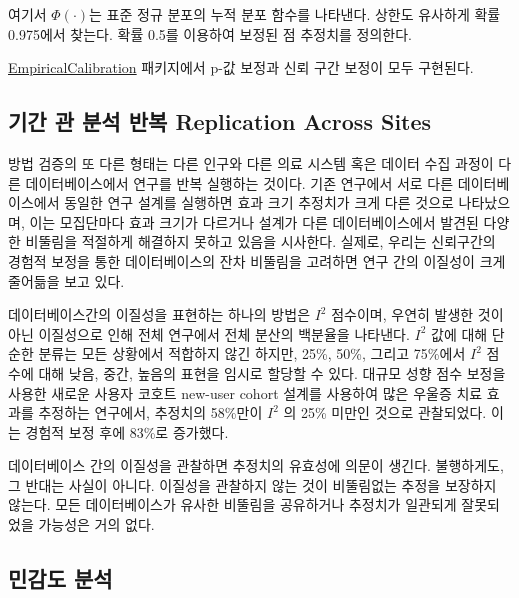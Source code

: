 \documentclass[10.5pt]{book}
\theoremstyle{definition}
\theoremstyle{definition}
\theoremstyle{definition}
\theoremstyle{remark}
\let\BeginKnitrBlock\begin \let\EndKnitrBlock\end
\begin{document}
여기서 \(\Phi(\cdot)\)는 표준 정규 분포의 누적 분포 함수를 나타낸다.
상한도 유사하게 확률 0.975에서 찾는다. 확률 0.5를 이용하여 보정된 점
추정치를 정의한다.

\href{https://ohdsi.github.io/EmpiricalCalibration/}{EmpiricalCalibration}
패키지에서 p-값 보정과 신뢰 구간 보정이 모두 구현된다.

\subsection{기간 관 분석 반복 Replication Across
Sites}\label{----replication-across-sites}


방법 검증의 또 다른 형태는 다른 인구와 다른 의료 시스템 혹은 데이터 수집
과정이 다른 데이터베이스에서 연구를 반복 실행하는 것이다. 기존 연구에서
서로 다른 데이터베이스에서 동일한 연구 설계를 실행하면 효과 크기
추정치가 크게 다른 것으로 나타났으며, \citep{madigan_2013} 이는
모집단마다 효과 크기가 다르거나 설계가 다른 데이터베이스에서 발견된
다양한 비뚤림을 적절하게 해결하지 못하고 있음을 시사한다. 실제로, 우리는
신뢰구간의 경험적 보정을 통한 데이터베이스의 잔차 비뚤림을 고려하면 연구
간의 이질성이 크게 줄어듦을 보고 있다. \citep{schuemie_2018}

데이터베이스간의 이질성을 표현하는 하나의 방법은 \(I^2\) 점수이며,
우연히 발생한 것이 아닌 이질성으로 인해 전체 연구에서 전체 분산의
백분율을 나타낸다. \citep{higgins_2003} \(I^2\) 값에 대해 단순한 분류는
모든 상황에서 적합하지 않긴 하지만, 25\%, 50\%, 그리고 75\%에서 \(I^2\)
점수에 대해 낮음, 중간, 높음의 표현을 임시로 할당할 수 있다. 대규모 성향
점수 보정을 사용한 새로운 사용자 코호트 new-user cohort 설계를 사용하여
많은 우울증 치료 효과를 추정하는 연구에서, \citep{schuemie_2018b}
추정치의 58\%만이 \(I^2\) 의 25\% 미만인 것으로 관찰되었다. 이는 경험적
보정 후에 83\%로 증가했다.

\BeginKnitrBlock{rmdimportant}
데이터베이스 간의 이질성을 관찰하면 추정치의 유효성에 의문이 생긴다.
불행하게도, 그 반대는 사실이 아니다. 이질성을 관찰하지 않는 것이
비뚤림없는 추정을 보장하지 않는다. 모든 데이터베이스가 유사한 비뚤림을
공유하거나 추정치가 일관되게 잘못되었을 가능성은 거의 없다.
\EndKnitrBlock{rmdimportant}

\subsection{민감도 분석}\label{-}

\end{document}
